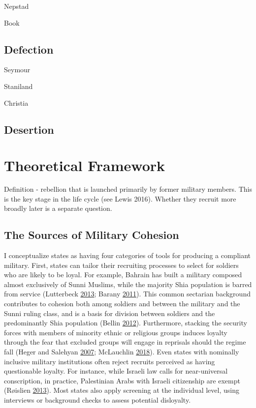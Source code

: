 \documentclass[
  12pt,
]{article}
\begin{document}
Nepstad

Book

\hypertarget{defection}{%
\subsection{Defection}\label{defection}}

Seymour

Staniland

Christia

\hypertarget{desertion}{%
\subsection{Desertion}\label{desertion}}

\hypertarget{theoretical-framework}{%
\section{Theoretical Framework}\label{theoretical-framework}}

Definition - rebellion that is launched primarily by former military members. This is the key stage in the life cycle (see Lewis 2016). Whether they recruit more broadly later is a separate question.

\hypertarget{the-sources-of-military-cohesion}{%
\subsection{The Sources of Military Cohesion}\label{the-sources-of-military-cohesion}}

I conceptualize states as having four categories of tools for producing a compliant military. First, states can tailor their recruiting processes to select for soldiers who are likely to be loyal. For example, Bahrain has built a military composed almost exclusively of Sunni Muslims, while the majority Shia population is barred from service (Lutterbeck \protect\hyperlink{ref-Lutterbeck2013}{2013}; Barany \protect\hyperlink{ref-Barany2011}{2011}). This common sectarian background contributes to cohesion both among soldiers and between the military and the Sunni ruling class, and is a basis for division between soldiers and the predominantly Shia population (Bellin \protect\hyperlink{ref-Bellin2012}{2012}). Furthermore, stacking the security forces with members of minority ethnic or religious groups induces loyalty through the fear that excluded groups will engage in reprisals should the regime fall (Heger and Salehyan \protect\hyperlink{ref-Heger2007a}{2007}; McLauchlin \protect\hyperlink{ref-McLauchlin2018}{2018}). Even states with nominally inclusive military institutions often reject recruits perceived as having questionable loyalty. For instance, while Israeli law calls for near-universal conscription, in practice, Palestinian Arabs with Israeli citizenship are exempt (Røislien \protect\hyperlink{ref-Roislien2013}{2013}). Most states also apply screening at the individual level, using interviews or background checks to assess potential disloyalty.
\end{document}
